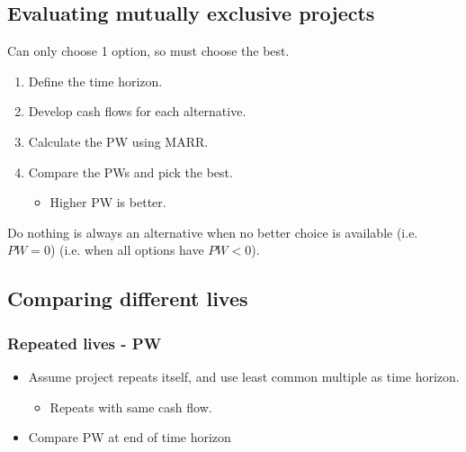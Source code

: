 \begin{example}
\end{example}

\begin{example}
\end{example}

\subsection{Evaluating mutually exclusive projects}
Can only choose 1 option, so must choose the best.
\begin{process}
    \begin{enumerate}
        \item Define the time horizon.
        
        \item Develop cash flows for each alternative.
        
        \item Calculate the PW using MARR.
        
        \item Compare the PWs and pick the best.
            \begin{itemize}
                \item Higher PW is better.
            \end{itemize}
    \end{enumerate}
\end{process}

\begin{warning}
    Do nothing is always an alternative when no better choice is available (i.e. $PW=0$) (i.e. when all options have $PW<0$).
\end{warning}

\begin{example}
\end{example}

\subsection{Comparing different lives}

\subsubsection{Repeated lives - PW}
\begin{definition}
    \begin{itemize}
        \item Assume project repeats itself, and use least common multiple as time horizon. 
        \begin{itemize}
            \item Repeats with same cash flow.
        \end{itemize}
        \item Compare PW at end of time horizon
    \end{itemize}
\end{definition}

